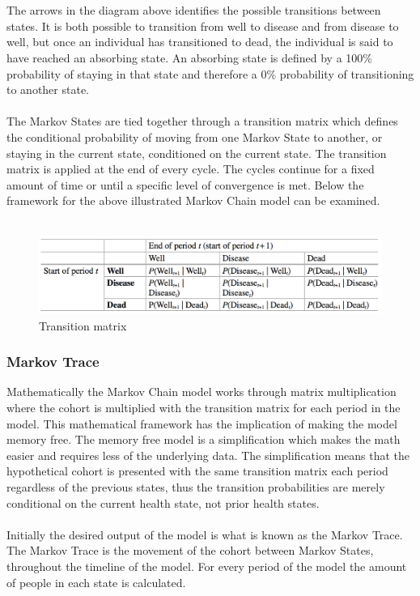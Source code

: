 \documentclass[a4paper,12pt]{article}
\begin{document}
\\\\
The arrows in the diagram above identifies the possible transitions between states. It is both possible to transition from well to disease and from disease to well, but once an individual has transitioned to dead, the individual is said to have reached an absorbing state. An absorbing state is defined by a 100\% probability of staying in that state and therefore a 0\% probability of transitioning to another state. 
\\\\
The Markov States are tied together through a transition matrix which defines the conditional probability of moving from one Markov State to another, or staying in the current state, conditioned on the current state. The transition matrix is applied at the end of every cycle. The cycles continue for a fixed amount of time or until a specific level of convergence is met. Below the framework for the above illustrated Markov Chain model can be examined.
\\\\
\begin{figure}[h]
	\centering
	\caption[]{Transition matrix}
	\label{fig:transition-matrix}
	\includegraphics[width=0.7\linewidth]{"Pictures/Transition matrix"}
\end{figure}




\subsubsection*{Markov Trace}
Mathematically the Markov Chain model works through matrix multiplication where the cohort is multiplied with the transition matrix for each period in the model. This mathematical framework has the implication of making the model memory free. The memory free model is a simplification which makes the math easier and requires less of the underlying data. The simplification means that the hypothetical cohort is presented with the same transition matrix each period regardless of the previous states, thus the transition probabilities are merely conditional on the current health state, not prior health states. 
\\\\
Initially the desired output of the model is what is known as the Markov Trace. The Markov Trace is the movement of the cohort between Markov States, throughout the timeline of the model. For every period of the model the amount of people in each state is calculated.
\end{document}
